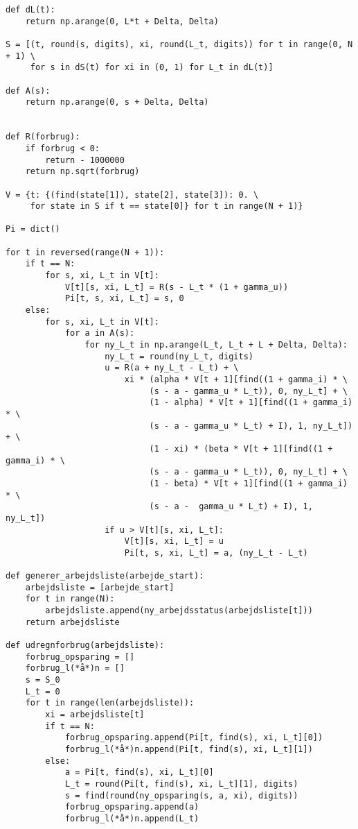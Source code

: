 \begin{lstlisting}[mathescape=true,caption={Python algoritme},label={kode:python}]
def dL(t):
    return np.arange(0, L*t + Delta, Delta)

S = [(t, round(s, digits), xi, round(L_t, digits)) for t in range(0, N + 1) \ 
     for s in dS(t) for xi in (0, 1) for L_t in dL(t)]

def A(s):
    return np.arange(0, s + Delta, Delta)


def R(forbrug):
    if forbrug < 0:
        return - 1000000
    return np.sqrt(forbrug)

V = {t: {(find(state[1]), state[2], state[3]): 0. \ 
     for state in S if t == state[0]} for t in range(N + 1)}

Pi = dict()

for t in reversed(range(N + 1)):
    if t == N:
        for s, xi, L_t in V[t]:
            V[t][s, xi, L_t] = R(s - L_t * (1 + gamma_u))    
            Pi[t, s, xi, L_t] = s, 0   
    else:
        for s, xi, L_t in V[t]:
            for a in A(s):
                for ny_L_t in np.arange(L_t, L_t + L + Delta, Delta):
                    ny_L_t = round(ny_L_t, digits)
                    u = R(a + ny_L_t - L_t) + \
                        xi * (alpha * V[t + 1][find((1 + gamma_i) * \ 
                             (s - a - gamma_u * L_t)), 0, ny_L_t] + \
                             (1 - alpha) * V[t + 1][find((1 + gamma_i) * \
                             (s - a - gamma_u * L_t) + I), 1, ny_L_t]) + \
                             (1 - xi) * (beta * V[t + 1][find((1 + gamma_i) * \
                             (s - a - gamma_u * L_t)), 0, ny_L_t] + \
                             (1 - beta) * V[t + 1][find((1 + gamma_i) * \
                             (s - a -  gamma_u * L_t) + I), 1, ny_L_t])
                    if u > V[t][s, xi, L_t]:
                        V[t][s, xi, L_t] = u
                        Pi[t, s, xi, L_t] = a, (ny_L_t - L_t)

def generer_arbejdsliste(arbejde_start):
    arbejdsliste = [arbejde_start]
    for t in range(N):
        arbejdsliste.append(ny_arbejdsstatus(arbejdsliste[t]))
    return arbejdsliste

def udregnforbrug(arbejdsliste):
    forbrug_opsparing = []
    forbrug_l(*å*)n = []
    s = S_0
    L_t = 0
    for t in range(len(arbejdsliste)):
        xi = arbejdsliste[t]
        if t == N:
            forbrug_opsparing.append(Pi[t, find(s), xi, L_t][0])
            forbrug_l(*å*)n.append(Pi[t, find(s), xi, L_t][1])
        else:
            a = Pi[t, find(s), xi, L_t][0]
            L_t = round(Pi[t, find(s), xi, L_t][1], digits)
            s = find(round(ny_opsparing(s, a, xi), digits))
            forbrug_opsparing.append(a)
            forbrug_l(*å*)n.append(L_t)


\end{lstlisting}

